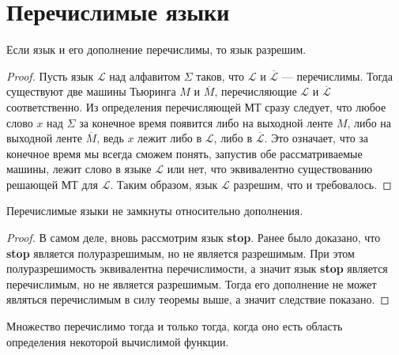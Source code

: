 \documentclass[11pt]{article}
\begin{document}
\section{Перечислимые языки}

\begin{theorem}
    Если язык и его дополнение перечислимы, то язык разрешим.
\end{theorem}

\begin{proof}
    Пусть язык $\mathcal{L}$ над алфавитом $\Sigma$ таков, что $\mathcal{L}$ и $\overline{\mathcal{L}}$ --- перечислимы. Тогда существуют две машины Тьюринга $M$ и $\overline{M}$, перечисляющие $\mathcal{L}$ и $\overline{\mathcal{L}}$ соответственно. Из определения перечисляющей МТ сразу следует, что любое слово $x$ над $\Sigma$ за конечное время появится либо на выходной ленте $M$, либо на выходной ленте $\overline{M}$, ведь $x$ лежит либо в $\mathcal{L}$, либо в $\overline{\mathcal{L}}$. Это означает, что за конечное время мы всегда сможем понять, запустив обе рассматриваемые машины, лежит слово в языке $\mathcal{L}$ или нет, что эквивалентно существованию решающей МТ для $\mathcal{L}$. Таким образом, язык $\mathcal{L}$ разрешим, что и требовалось.
\end{proof}

\begin{consequence}
    Перечислимые языки не замкнуты относительно дополнения.
\end{consequence}

\begin{proof}
    В самом деле, вновь рассмотрим язык \textbf{stop}. Ранее было доказано, что \textbf{stop} является полуразрешимым, но не является разрешимым. При этом полуразрешимость эквивалентна перечислимости, а значит язык \textbf{stop} является перечислимым, но не является разрешимым. Тогда его дополнение не может являться перечислимым в силу теоремы выше, а значит следствие показано.
\end{proof}

\begin{theorem}
    Множество перечислимо тогда и только тогда, когда оно есть область определения некоторой вычислимой функции.
\end{theorem}
\end{document}
